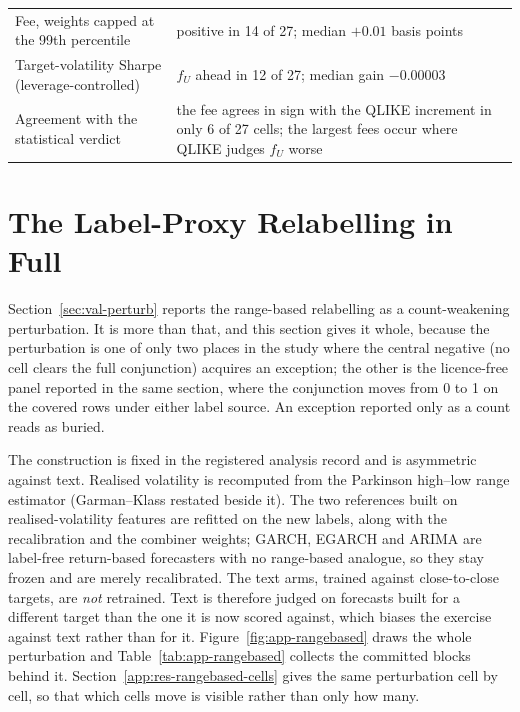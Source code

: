 \begin{table}[htbp]
\begin{tabular}{@{}lp{}@{}}
Fee, weights capped at the 99th percentile & positive in 14 of 27; median $+0.01$ basis points \\ %
Target-volatility Sharpe (leverage-controlled) & $f_U$ ahead in 12 of 27; median gain $-0.00003$ \\ %
Agreement with the statistical verdict & the fee agrees in sign with the QLIKE increment in only 6 of 27 cells; the largest fees occur where QLIKE judges $f_U$ worse \\ %
\bottomrule
\end{tabular}
\end{table}

\FloatBarrier
\section{The Label-Proxy Relabelling in Full}
\label{app:res-rangebased}

Section~\ref{sec:val-perturb} reports the range-based relabelling as a
count-weakening perturbation. It is more than that, and this section gives
it whole, because the perturbation is one of only two places in the study
where the central negative (no cell clears the full conjunction) acquires an
exception; the other is the licence-free panel reported in the same section,
where the conjunction moves from 0 to 1 on the covered rows under either
label source. An exception reported only as a count reads as buried.

The construction is fixed in the registered analysis record and is
asymmetric against text. Realised volatility is recomputed from the
Parkinson high--low range estimator (Garman--Klass restated beside it).
The two references built on realised-volatility features are refitted on the
new labels, along with the recalibration and the combiner weights; GARCH,
EGARCH and ARIMA are label-free return-based forecasters with no range-based
analogue, so they stay frozen and are merely recalibrated. The text arms, trained against
close-to-close targets, are \emph{not} retrained. Text is therefore judged
on forecasts built for a different target than the one it is now scored
against, which biases the exercise against text rather than for it.
Figure~\ref{fig:app-rangebased} draws the whole perturbation and
Table~\ref{tab:app-rangebased} collects the committed blocks behind it.
Section~\ref{app:res-rangebased-cells} gives the same perturbation cell by
cell, so that which cells move is visible rather than only how many.


